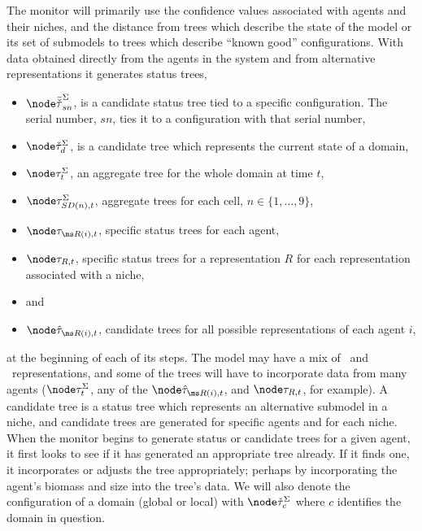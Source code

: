The monitor will primarily use the confidence values associated with
agents and their niches, and the distance from trees which describe
the state of the model or its set of submodels to trees which describe
``known good'' con\-fig\-ur\-a\-tions. With data obtained directly from the
agents in the system and from alternative rep\-re\-sen\-ta\-tions it generates
status trees,
\begin{itemize}
\item{\qquad} $\cst{sn}$, is a candidate status tree tied to a
  specific  con\-fig\-ur\-a\-tion. The serial number, $sn$, ties it to a
  con\-fig\-ur\-a\-tion with that serial number,
\item{\qquad} $\domt{d}$, is a candidate tree which represents the
  current state of a domain,
\item[\qquad] $\stmA{t}$, an aggregate tree for the whole domain at
  time $t$,
\item[\qquad] $\stsdA{n}{t}$, aggregate trees for each cell, $n \in \{1,\ldots, 9\}$,
\item[\qquad] $\sta{R}{i}{t}$, specific status trees for each agent,
\item[\qquad] $\nstaR{R}{t}$, specific status trees for a 
  rep\-re\-sen\-ta\-tion $R$ for each rep\-re\-sen\-ta\-tion associated with a niche,
\item[\qquad] \qquad and
\item[\qquad] $\asta{R}{i}{t}$, candidate trees for all possible
  rep\-re\-sen\-ta\-tions of each agent $i$,
\end{itemize}
at the beginning of each of its steps. The model may have a mix of
\SD\ and \IB\ rep\-re\-sen\-ta\-tions, and some of the trees will have to
incorporate data from many agents ($\stmA{t}$, any of the
$\asta{R}{i}{t}$, and $\nstaR{R}{t}$, for example). A candidate tree is
a status tree which represents an alternative sub\-model in a niche, and
candidate trees are generated for specific agents and for each niche. When the
monitor begins to generate status or candidate trees for a given
agent, it first looks to see if it has generated an appropriate tree
already.  If it finds one, it incorporates or adjusts the tree
appropriately; perhaps by incorporating the agent's biomass  and size
into the tree's data.  We will also denote the con\-fig\-ur\-a\-tion of a
domain (global or local) with $\domt{c}$ where $c$ identifies the
domain in question.

